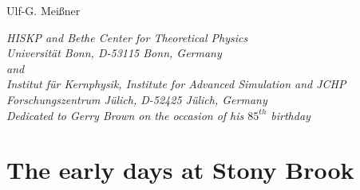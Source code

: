\documentclass[a4paper,fleqn]{scrartcl}
\begin{document}
\begin{center}
{{\huge\bf{}}}

\vspace{.4cm}

{\large Ulf-G. Mei\ss ner}

\bigskip

{\sl  HISKP and Bethe Center for Theoretical Physics\\
     Universit\"at Bonn, D-53115 Bonn, Germany\\and\\
     Institut f\"ur Kernphysik, Institute for Advanced Simulation and JCHP\\ 
     Forschungszentrum J\"ulich, D-52425 J\"ulich, Germany\\[0.9em]
        {\rm Dedicated to Gerry Brown on the occasion of his $85^{th}$ birthday}}

\bigskip

\begin{abstract}
These are personal recollections of  how Gerry Brown's work and thinking
influenced the development of the 
chiral effective Lagrangian based theory of nuclear forces.
\end{abstract}
\end{center}

\bigskip

\section{The early days at Stony Brook}
\end{document}
